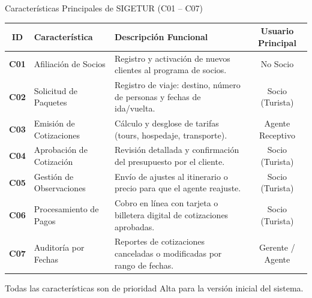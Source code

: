 \documentclass[aspectratio=169, 10pt]{beamer}
\begin{document}
\begin{frame}{Características Principales de SIGETUR (C01 -- C07)}
    \footnotesize
    \begin{table}[H]
    \centering
    \renewcommand{\arraystretch}{1.15}
    \begin{tabularx}{\textwidth}{clLc}
    \hline
    \textbf{ID} & \textbf{Característica} & \textbf{Descripción Funcional} & \textbf{Usuario Principal} \\ \hline
    \textbf{C01} & Afiliación de Socios & Registro y activación de nuevos clientes al programa de socios. & No Socio \\ \hline
    \textbf{C02} & Solicitud de Paquetes & Registro de viaje: destino, número de personas y fechas de ida/vuelta. & Socio (Turista) \\ \hline
    \textbf{C03} & Emisión de Cotizaciones & Cálculo y desglose de tarifas (tours, hospedaje, transporte). & Agente Receptivo \\ \hline
    \textbf{C04} & Aprobación de Cotización & Revisión detallada y confirmación del presupuesto por el cliente. & Socio (Turista) \\ \hline
    \textbf{C05} & Gestión de Observaciones & Envío de ajustes al itinerario o precio para que el agente reajuste. & Socio (Turista) \\ \hline
    \textbf{C06} & Procesamiento de Pagos & Cobro en línea con tarjeta o billetera digital de cotizaciones aprobadas. & Socio (Turista) \\ \hline
    \textbf{C07} & Auditoría por Fechas & Reportes de cotizaciones canceladas o modificadas por rango de fechas. & Gerente / Agente \\ \hline
    \end{tabularx}
    \end{table}
    \vspace{0.1cm}
    \centering \scriptsize Todas las características son de prioridad Alta para la versión inicial del sistema.
\end{frame}

\end{document}
